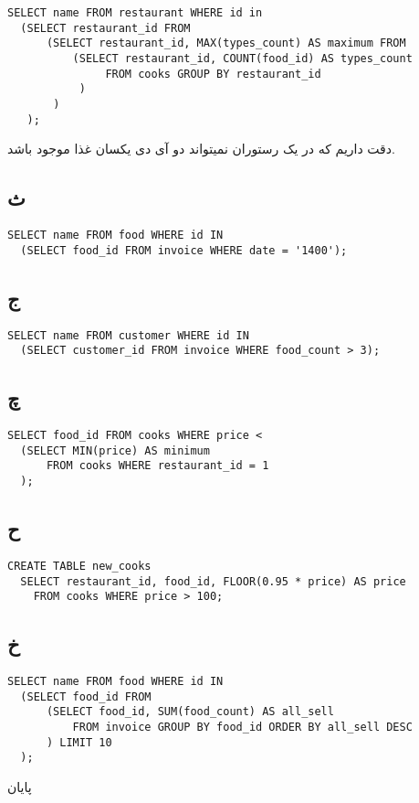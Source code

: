 \documentclass[a4paper]{article}
\makeatletter
\newcommand{\emailone}{\texttt{abbas.yazdanmehr1@gmail.com}}
\newcommand{\myinf}{
	\author{
عباس یزدان مهر
\\
99243077\\
 مهندسی کامپیوتر, دانشگاه شهید بهشتی
\\
\emailone
	}
}
\newcommand{\goodBYe}{\begin{center}{\huge
پایان
}\end{center}}
\makeatother
\begin{document}
\begin{latin}
\begin{lstlisting}
SELECT name FROM restaurant WHERE id in
  (SELECT restaurant_id FROM
      (SELECT restaurant_id, MAX(types_count) AS maximum FROM
          (SELECT restaurant_id, COUNT(food_id) AS types_count
               FROM cooks GROUP BY restaurant_id
           )
       )
   );  
\end{lstlisting}
\end{latin}
دقت داریم که در یک رستوران نمیتواند دو آی دی یکسان غذا موجود باشد.

\subsection*{ث}

\begin{latin}
\begin{lstlisting}
SELECT name FROM food WHERE id IN 
  (SELECT food_id FROM invoice WHERE date = '1400');
\end{lstlisting}
\end{latin}



\subsection*{ج}

\begin{latin}
\begin{lstlisting}
SELECT name FROM customer WHERE id IN
  (SELECT customer_id FROM invoice WHERE food_count > 3);
\end{lstlisting}
\end{latin}
\noindent \noindent \myinf
\subsection*{چ}

\begin{latin}
\begin{lstlisting}
SELECT food_id FROM cooks WHERE price <
  (SELECT MIN(price) AS minimum 
      FROM cooks WHERE restaurant_id = 1
  );
\end{lstlisting}
\end{latin}

\subsection*{ح}

\begin{latin}
\begin{lstlisting}
CREATE TABLE new_cooks
  SELECT restaurant_id, food_id, FLOOR(0.95 * price) AS price
    FROM cooks WHERE price > 100;
\end{lstlisting}
\end{latin}

\subsection*{خ}
\begin{latin}
\begin{lstlisting}
SELECT name FROM food WHERE id IN  
  (SELECT food_id FROM 
      (SELECT food_id, SUM(food_count) AS all_sell 
          FROM invoice GROUP BY food_id ORDER BY all_sell DESC
      ) LIMIT 10
  );
\end{lstlisting}
\end{latin}

\newpage
\goodBYe
\end{document}
